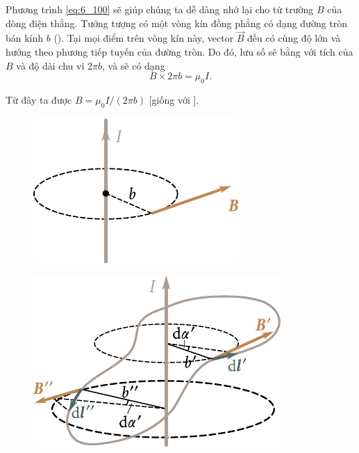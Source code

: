 Phương trình \eqref{eq:6_100} sẽ giúp chúng ta dễ dàng nhớ lại  cho từ trường $B$ của dòng điện thẳng. Tưởng tượng có một vòng kín đồng phẳng có dạng đường tròn bán kính $b$ (). Tại mọi điểm trên vòng kín này, vector $\vec{B}$ đều có cùng độ lớn và hướng theo phương tiếp tuyến của đường tròn. Do đó, lưu số sẽ bằng với tích của $B$ và độ dài chu vi $2\pi b$, và  sẽ có dạng
\begin{equation*}
    B \times 2\pi b = \mu_0 I.
\end{equation*}

\noindent
Từ đây ta được $B=\mu_0 I/(2\pi b)$ [giống với ].

\begin{figure}[t]
	\begin{minipage}[t]{0.41\linewidth}
		\begin{center}
			\includegraphics[scale=1]{figures/ch_06/fig_6_25.pdf}
			\caption[]{}
			\label{fig:6_25}
		\end{center}
	\end{minipage}
	\hfill{ }%
	\begin{minipage}[t]{0.55\linewidth}
		\begin{center}
			\includegraphics[scale=1]{figures/ch_06/fig_6_26.pdf}
			\caption[]{}
			\label{fig:6_26}
		\end{center}
	\end{minipage}
\vspace{-0.4cm}
\end{figure}

